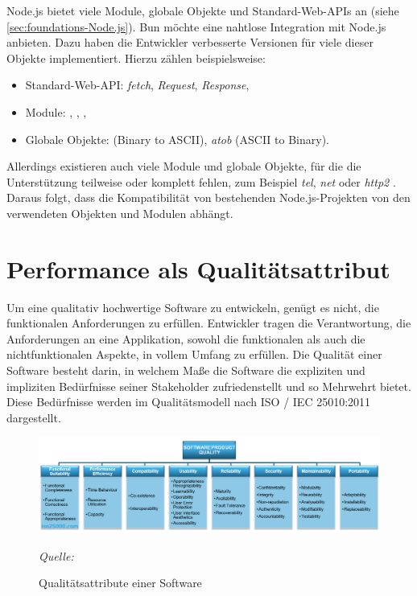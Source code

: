 \noindent
Node.js bietet viele Module, globale Objekte und Standard-Web-APIs an (siehe \autoref{sec:foundations-Node.js}). Bun möchte eine nahtlose Integration mit Node.js anbieten. Dazu haben die Entwickler verbesserte Versionen für viele dieser Objekte implementiert. Hierzu zählen beispielsweise:
\begin{itemize}
	\item Standard-Web-API: \textit{fetch}, \textit{Request}, \textit{Response},
	\item Module: , , ,
	\item Globale Objekte:  (Binary to ASCII), \textit{atob} (ASCII to Binary).\cite{OvenSh.2023c}
\end{itemize} 

\noindent
Allerdings existieren auch viele Module und globale Objekte, für die die Unterstützung teilweise oder komplett fehlen, zum Beispiel \textit{tel}, \textit{net} oder \textit{http2} \cite{OvenSh.2023c}. Daraus folgt, dass die Kompatibilität von bestehenden Node.js-Projekten von den verwendeten Objekten und Modulen abhängt.

\section{Performance als Qualitätsattribut} \label{sec:foundations-Performance}
Um eine qualitativ hochwertige Software zu entwickeln, genügt es nicht, die funktionalen Anforderungen zu erfüllen. Entwickler tragen die Verantwortung, die Anforderungen an eine Applikation, sowohl die funktionalen als auch die nichtfunktionalen Aspekte, in vollem Umfang zu erfüllen. Die Qualität einer Software besteht darin, in welchem Maße die Software die expliziten und impliziten Bedürfnisse seiner Stakeholder zufriedenstellt und so Mehrwehrt bietet. Diese Bedürfnisse werden im Qualitätsmodell nach ISO / IEC 25010:2011 dargestellt.\cite{.2022}\\

\begin{figure}[h]
	\centering
	\includegraphics[width=\linewidth]{./images/iso25010.png}
	\caption{Qualitätsattribute einer Software}
	\label{fig:softwareQuality}
	\textit{Quelle: \cite{.2022}}
\end{figure}

